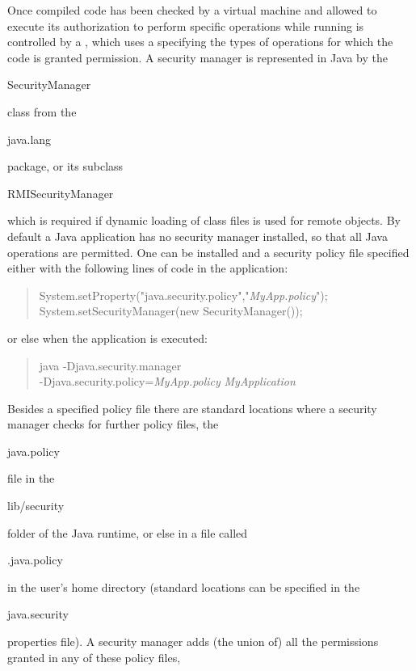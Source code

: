 Once compiled code has been checked by a virtual machine and allowed to execute
its authorization to perform specific operations while running is controlled by a
, which uses a  specifying
the types of operations for which the code is granted permission.
A security manager is represented in Java by the \begin{code}SecurityManager\end{code}
class from the \begin{code}java.lang\end{code} package, or its
subclass \begin{code}RMISecurityManager\end{code} which is required
if dynamic loading of class files is used for remote objects.
By default a Java application has no security manager installed, so that all
Java operations are permitted.
One can be installed and a security policy file specified either
with the following lines of code in the application:
\begin{quote}\begin{code}
System.setProperty("java.security.policy","\emph{MyApp.policy}"); \\
System.setSecurityManager(new SecurityManager());
\end{code}\end{quote}
or else when the application is executed:
\begin{quote}\begin{code}
java -Djava.security.manager \\
\trind -Djava.security.policy=\emph{MyApp.policy} \emph{MyApplication}
\end{code}\end{quote}
Besides a specified policy file there are standard locations where
a security manager checks for further policy files,
the \begin{code}java.policy\end{code} file in the \begin{code}lib/security\end{code}
folder of the Java runtime, or else in a file called \begin{code}.java.policy\end{code}
in the user's home directory (standard locations can be specified in the
\begin{code}java.security\end{code} properties file).
A security manager adds (the union of) all the permissions granted in any of these policy files,
